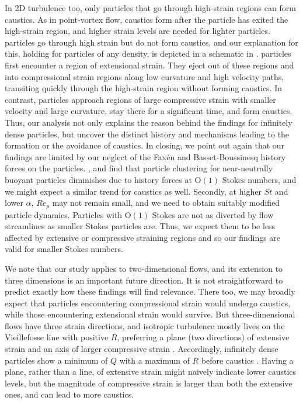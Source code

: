 In 2D turbulence too, only particles that go through high-strain regions can form caustics. As in point-vortex flow, caustics form after the particle has exited the high-strain region, and higher strain levels are needed for lighter particles. \su particles go through high strain but do not form caustics, and our explanation for this, holding for particles of any density, is depicted in a schematic in . \su particles first encounter a region of extensional strain. They eject out of these regions and into compressional strain regions along low curvature and high velocity paths, transiting quickly through the high-strain region without forming caustics. In contrast, \cs particles approach regions of large compressive strain with smaller velocity and large curvature, stay there for a significant time, and form caustics. Thus, our analysis not only explains the reason behind the \citet{batge2023} findings for infinitely dense particles, but uncover the distinct history and mechanisms leading to the formation or the avoidance of caustics. 
In closing, we point out again that our findings are limited by our neglect of the Fax\'en and Basset-Boussinesq history forces on the particles. \citet{olivieri2014}, and \citet{daitche2015} find that particle clustering for near-neutrally buoyant particles diminishes due to history forces at O$(1)$ Stokes numbers, and we might expect a similar trend for caustics as well. Secondly, at higher $St$ and lower $\alpha$, $Re_p$ may not remain small, and we need to obtain suitably modified particle dynamics. {Particles with $\text{O}(1)$ Stokes are not as diverted by flow streamlines as smaller Stokes particles are. Thus, we expect them to be less affected by extensive or compressive straining regions and so our findings are valid for smaller Stokes numbers. }

{We note that our study applies to two-dimensional flows, and its extension to three dimensions is an important future direction. It is not straightforward to predict exactly how these findings will find relevance. There too, we may broadly expect that particles encountering compressional strain would undergo caustics, while those encountering extensional strain would survive. But three-dimensional flows have three strain directions, and isotropic turbulence mostly lives on the Vieillefosse line with positive $R$, preferring a plane (two directions) of extensive strain and an axis of larger compressive strain \cite{ashurst1987,meneveau2011}. Accordingly, infinitely dense particles show a minimum of $Q$ with a maximum of $R$ before caustics \cite{zhang2025}. Having a plane, rather than a line, of extensive strain might naively indicate lower caustics levels, but the magnitude of compressive strain is larger than both the extensive ones, and can lead to more caustics. }

